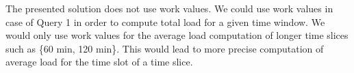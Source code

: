 The presented solution does not use work values. We could use work values in case of Query 1 in order to compute total load for a given time window. We would only use work values for the average load computation of longer time slices such as \{60 min, 120 min\}. This would lead to more precise computation of average load for the time slot of a time slice.
